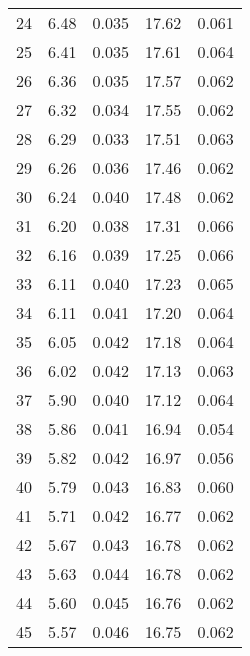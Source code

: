 \begin{table}
\begin{tabular}{c|ll|ll}
24 & 6.48 & 0.035 & 17.62 & 0.061 \\
25 & 6.41 & 0.035 & 17.61 & 0.064 \\
26 & 6.36 & 0.035 & 17.57 & 0.062 \\
27 & 6.32 & 0.034 & 17.55 & 0.062 \\
28 & 6.29 & 0.033 & 17.51 & 0.063 \\
29 & 6.26 & 0.036 & 17.46 & 0.062 \\
30 & 6.24 & 0.040 & 17.48 & 0.062 \\
31 & 6.20 & 0.038 & 17.31 & 0.066 \\
32 & 6.16 & 0.039 & 17.25 & 0.066 \\
33 & 6.11 & 0.040 & 17.23 & 0.065 \\
34 & 6.11 & 0.041 & 17.20 & 0.064 \\
35 & 6.05 & 0.042 & 17.18 & 0.064 \\
36 & 6.02 & 0.042 & 17.13 & 0.063 \\
37 & 5.90 & 0.040 & 17.12 & 0.064 \\
38 & 5.86 & 0.041 & 16.94 & 0.054 \\
39 & 5.82 & 0.042 & 16.97 & 0.056 \\
40 & 5.79 & 0.043 & 16.83 & 0.060 \\
41 & 5.71 & 0.042 & 16.77 & 0.062 \\
42 & 5.67 & 0.043 & 16.78 & 0.062 \\
43 & 5.63 & 0.044 & 16.78 & 0.062 \\
44 & 5.60 & 0.045 & 16.76 & 0.062 \\
45 & 5.57 & 0.046 & 16.75 & 0.062 \\
               \hline
        \end{tabular}
    \end{table}
    \clearpage

